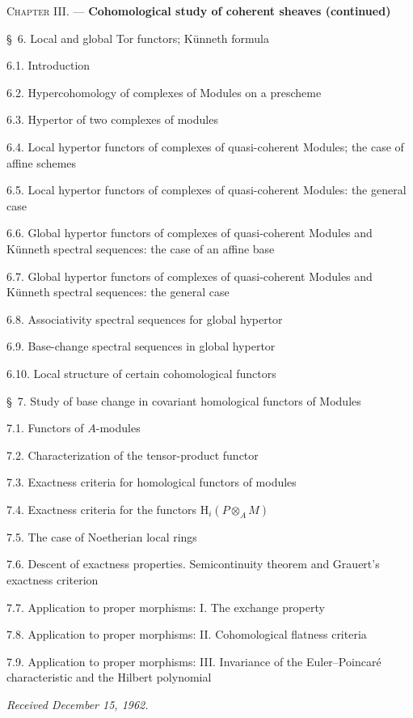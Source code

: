 \begin{flushleft}
\textsc{Chapter III.} --- \textbf{Cohomological study of coherent sheaves
(continued)} 

\medskip
\S~6. Local and global Tor functors; Künneth formula 

6.1. Introduction 

6.2. Hypercohomology of complexes of Modules on a prescheme 

6.3. Hypertor of two complexes of modules 

6.4. Local hypertor functors of complexes of quasi-coherent Modules; the case
of affine schemes 

6.5. Local hypertor functors of complexes of quasi-coherent Modules: the
general case 

6.6. Global hypertor functors of complexes of quasi-coherent Modules and
Künneth spectral sequences: the case of an affine base 

6.7. Global hypertor functors of complexes of quasi-coherent Modules and
Künneth spectral sequences: the general case 

6.8. Associativity spectral sequences for global hypertor 

6.9. Base-change spectral sequences in global hypertor 

6.10. Local structure of certain cohomological functors 

\medskip
\S~7. Study of base change in covariant homological functors of Modules

7.1. Functors of $A$-modules 

7.2. Characterization of the tensor-product functor 

7.3. Exactness criteria for homological functors of modules 

7.4. Exactness criteria for the functors $\mathrm H_i(P\otimes_A M)$

7.5. The case of Noetherian local rings 

7.6. Descent of exactness properties. Semicontinuity theorem and Grauert's
exactness criterion 

7.7. Application to proper morphisms: I. The exchange property 

7.8. Application to proper morphisms: II. Cohomological flatness criteria

7.9. Application to proper morphisms: III. Invariance of the Euler--Poincaré
characteristic and the Hilbert polynomial 

\begin{flushright}
\emph{Received December 15, 1962.}
\end{flushright}
\end{flushleft}

